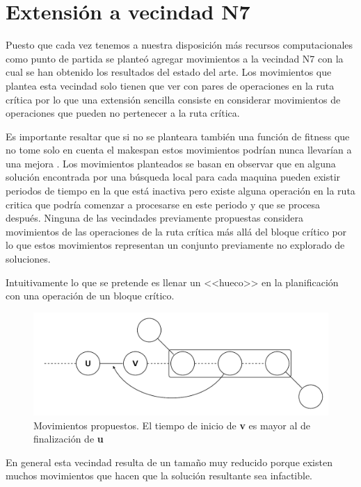 \section{Extensión a vecindad N7}

Puesto que cada vez tenemos a nuestra disposición más recursos computacionales como punto de partida se planteó agregar movimientos a la vecindad N7 con la cual se han obtenido los resultados del estado del arte.
Los movimientos que plantea esta vecindad solo tienen que ver con pares de operaciones en la ruta crítica por lo que una extensión sencilla consiste en considerar movimientos de operaciones que pueden no pertenecer a la ruta crítica. 

Es importante resaltar que si no se planteara también una función de fitness que no tome solo en cuenta el makespan estos movimientos podrían nunca llevarían a una mejora \cite{blazewicz1996job}. 
Los movimientos planteados se basan en observar que en alguna solución encontrada por una búsqueda local para cada maquina pueden existir periodos de tiempo en la que está inactiva pero existe alguna operación en la ruta critica que podría comenzar a procesarse en este periodo y que se procesa después. Ninguna de las vecindades previamente propuestas considera movimientos de las operaciones de la ruta crítica más allá del bloque crítico por lo que estos movimientos representan un conjunto previamente no explorado de soluciones.

Intuitivamente lo que se pretende es llenar un <<hueco>> en la planificación con una operación de un bloque crítico.

\begin{figure}[H]
\centering
\includegraphics[scale=.7]{Imagenes/N8.pdf}
    \caption{Movimientos propuestos. El tiempo de inicio de \textbf{v} es mayor al de finalización de \textbf{u}}
\end{figure}

En general esta vecindad resulta de un tamaño muy reducido porque existen muchos movimientos que hacen que la solución resultante sea infactible. 
